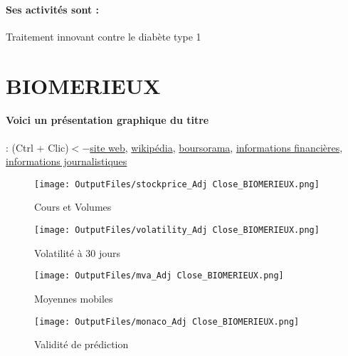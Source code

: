 \documentclass[11pt,a4paper]{report}%
\begin{document}
\paragraph{Ses activités sont : } Traitement innovant contre le diabète type 1 
    
    \newpage

\section{BIOMERIEUX}

\paragraph{Voici un présentation graphique du titre} : (Ctrl + Clic)$<-$\href{https://www.biomerieux.com/fr/investisseurs}{site web}, \href{https://fr.wikipedia.org/wiki/BioM%C3%A9rieux}{wikipédia}, \href{https://www.boursorama.com/cours/1rPBIM}{boursorama}, \href{https://www.qwant.com/?q=site:https:%2f%2fwww.easybourse.com%2faction-societe%2fBIOMERIEUX&t=web&client=ext-firefox-hp}{informations financières}, \href{https://bourse.lerevenu.com/cours-de-bourse/fiche-valeur-synthese/BIOMERIEUX/BIM-FR}{informations journalistiques}
\begin{figure}[!htb]
   \begin{minipage}{0.5\textwidth}
     \centering
     \texttt{[image: OutputFiles/stockprice\_Adj Close\_BIOMERIEUX.png]}
     \caption{Cours et Volumes}\label{Fig:price_BIOMERIEUX}
   \end{minipage}\hfill
   \begin{minipage}{0.5\textwidth}
     \centering
     \texttt{[image: OutputFiles/volatility\_Adj Close\_BIOMERIEUX.png]}
     \caption{Volatilité à 30 jours}\label{Fig:volat_BIOMERIEUX}
   \end{minipage}
\end{figure}
\begin{figure}[!htb]
   \begin{minipage}{0.5\textwidth}
     \centering
     \texttt{[image: OutputFiles/mva\_Adj Close\_BIOMERIEUX.png]}
     \caption{Moyennes mobiles}\label{Fig:mva_BIOMERIEUX}
   \end{minipage}\hfill
   \begin{minipage}{0.5\textwidth}
     \centering
     \texttt{[image: OutputFiles/monaco\_Adj Close\_BIOMERIEUX.png]}
     \caption{Validité de prédiction}\label{Fig:prediction_BIOMERIEUX}
   \end{minipage}
\end{figure}
\end{document}
